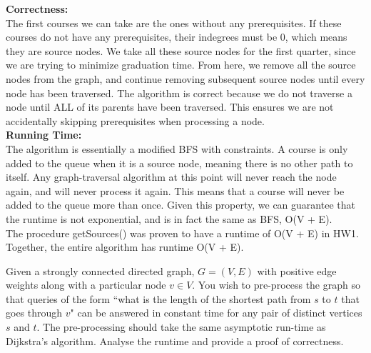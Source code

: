 \documentclass{exam}
\begin{document}
\begin{questions}
{\bf Correctness:}\\
The first courses we can take are the ones without any prerequisites. If these courses do not have any prerequisites, their indegrees must be 0, which means they are source nodes. We take all these source nodes for the first quarter, since we are trying to minimize graduation time. From here, we remove all the source nodes from the graph, and continue removing subsequent source nodes until every node has been traversed. The algorithm is correct because we do not traverse a node until ALL of its parents have been traversed. This ensures we are not accidentally skipping prerequisites when processing a node.\\


{\bf Running Time:}\\
The algorithm is essentially a modified BFS with constraints. A course is only added to the queue when it is a source node, meaning there is no other path to itself. Any graph-traversal algorithm at this point will never reach the node again, and will never process it again. This means that a course will never be added to the queue more than once. Given this property, we can guarantee that the runtime is not exponential, and is in fact the same as BFS, O(V + E).\\

The procedure getSources() was proven to have a runtime of O(V  + E) in HW1. Together, the entire algorithm has runtime O(V + E).\\

\vspace{0.2in}





\question[20] Given a strongly connected directed graph, $G = (V, E)$ with positive edge weights along with a particular node $v \in V$. 
You wish to pre-process the graph so that queries of the form ``what is the length of the shortest path from $s$ to $t$ that goes through $v$" can be answered in constant time for any pair of distinct vertices $s$ and $t$. The pre-processing should take the same asymptotic run-time as Dijkstra's algorithm. Analyse the runtime and provide a proof of correctness.\\


\end{questions}
\end{document}
